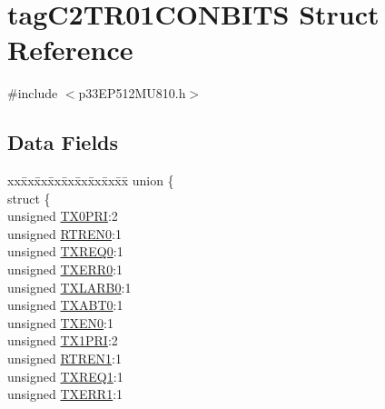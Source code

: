 \hypertarget{structtag_c2_t_r01_c_o_n_b_i_t_s}{}\section{tag\+C2\+T\+R01\+C\+O\+N\+B\+I\+TS Struct Reference}
\label{structtag_c2_t_r01_c_o_n_b_i_t_s}


{\ttfamily \#include $<$p33\+E\+P512\+M\+U810.\+h$>$}

\subsection*{Data Fields}
\begin{DoxyCompactItemize}
\item 
\begin{tabbing}
xx\=xx\=xx\=xx\=xx\=xx\=xx\=xx\=xx\=\kill
union \{\\
\>struct \{\\
\>\>unsigned \hyperlink{structtag_c2_t_r01_c_o_n_b_i_t_s_a9c9cb40940fea7bd19219f6b51374e0e}{TX0PRI}:2\\
\>\>unsigned \hyperlink{structtag_c2_t_r01_c_o_n_b_i_t_s_a25119151e27cc975097779e0656b2ae3}{RTREN0}:1\\
\>\>unsigned \hyperlink{structtag_c2_t_r01_c_o_n_b_i_t_s_af1df88e53ab7e28b18741e1a0a1fbcd7}{TXREQ0}:1\\
\>\>unsigned \hyperlink{structtag_c2_t_r01_c_o_n_b_i_t_s_a249dd262057f7b57dbf403ace998f248}{TXERR0}:1\\
\>\>unsigned \hyperlink{structtag_c2_t_r01_c_o_n_b_i_t_s_a5aa1b6d21403bf98f2c2429987488dad}{TXLARB0}:1\\
\>\>unsigned \hyperlink{structtag_c2_t_r01_c_o_n_b_i_t_s_ad9ec9acbf73740bb2cec60618b27c3c8}{TXABT0}:1\\
\>\>unsigned \hyperlink{structtag_c2_t_r01_c_o_n_b_i_t_s_a52d055e701b7924e51ddc82b3bb62262}{TXEN0}:1\\
\>\>unsigned \hyperlink{structtag_c2_t_r01_c_o_n_b_i_t_s_aa3dce2acdb2adeff30ef611cf72fcc20}{TX1PRI}:2\\
\>\>unsigned \hyperlink{structtag_c2_t_r01_c_o_n_b_i_t_s_ac17f546c2a70389e527c36f92818806e}{RTREN1}:1\\
\>\>unsigned \hyperlink{structtag_c2_t_r01_c_o_n_b_i_t_s_a68518d5d2618c8ec06a28b757b066c17}{TXREQ1}:1\\
\>\>unsigned \hyperlink{structtag_c2_t_r01_c_o_n_b_i_t_s_a9c2b4ca0992eeeced937d55813e4e639}{TXERR1}:1\\

\end{tabbing}
\end{DoxyCompactItemize}

